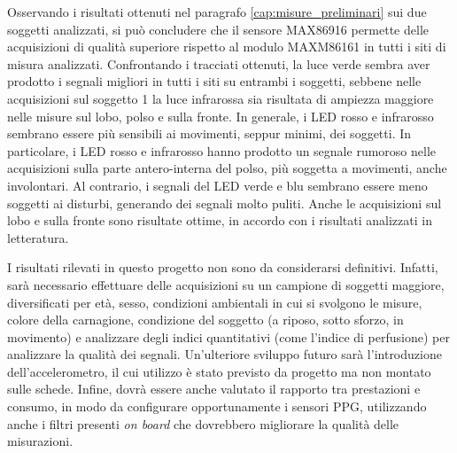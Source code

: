 \documentclass[
	a4paper,
	cleardoublepage=empty,
	headings=twolinechapter,
	numbers=autoenddot,
]{scrbook}
\begin{document}
	Osservando i risultati ottenuti nel paragrafo \ref{cap:misure_preliminari} sui due soggetti analizzati, si può concludere che il sensore MAX86916 permette delle acquisizioni di qualità superiore rispetto al modulo MAXM86161 in tutti i siti di misura analizzati. Confrontando i tracciati ottenuti, la luce verde sembra aver prodotto i segnali migliori in tutti i siti su entrambi i soggetti, sebbene nelle acquisizioni sul soggetto 1 la luce infrarossa sia risultata di ampiezza maggiore nelle misure sul lobo, polso e sulla fronte. In generale, i LED rosso e infrarosso sembrano essere più sensibili ai movimenti, seppur minimi, dei soggetti. In particolare, i LED rosso e infrarosso hanno prodotto un segnale rumoroso nelle acquisizioni sulla parte antero-interna del polso, più soggetta a movimenti, anche involontari. Al contrario, i segnali del LED verde e blu sembrano essere meno soggetti ai disturbi, generando dei segnali molto puliti. Anche le acquisizioni sul lobo e sulla fronte sono risultate ottime, in accordo con i risultati analizzati in letteratura.
	
	I risultati rilevati in questo progetto non sono da considerarsi definitivi. Infatti, sarà necessario effettuare delle acquisizioni su un campione di soggetti maggiore, diversificati per età, sesso, condizioni ambientali in cui si svolgono le misure, colore della carnagione, condizione del soggetto (a riposo, sotto sforzo, in movimento) e analizzare degli indici quantitativi (come l'indice di perfusione) per analizzare la qualità dei segnali. Un'ulteriore sviluppo futuro sarà l'introduzione dell'accelerometro, il cui utilizzo è stato previsto da progetto ma non montato sulle schede. Infine, dovrà essere anche valutato il rapporto tra prestazioni e consumo, in modo da configurare opportunamente i sensori PPG, utilizzando anche i filtri presenti \textit{on board} che dovrebbero migliorare la qualità delle misurazioni.
	

	
	
	
	
\end{document}
